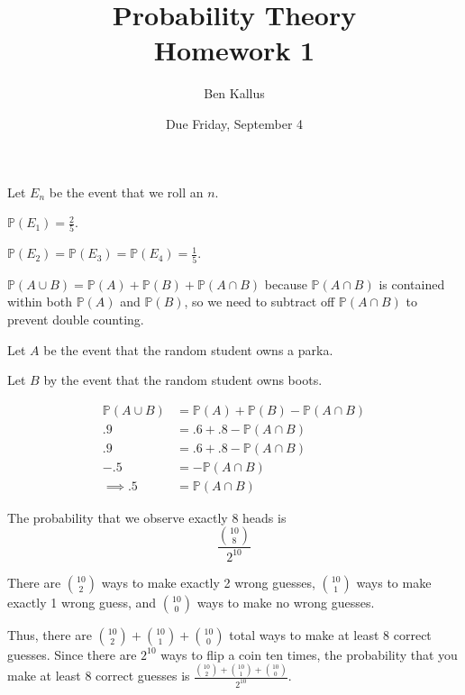 \documentclass[12pt]{article}
\title{Probability Theory \\ Homework 1}
\author{Ben Kallus}
\date{Due Friday, September 4}
\begin{document}
\maketitle


    Let $E_n$ be the event that we roll an $n$.

    $\mathbb P(E_1) = \frac 2 5$.
    
    $\mathbb P(E_2) = \mathbb P(E_3) = \mathbb P(E_4) = \frac 1 5$.

\medskip
{}


    $\mathbb P(A \cup B) = \mathbb P(A) + \mathbb P(B) + \mathbb P(A \cap B)$ because $\mathbb P(A \cap B)$ is contained within both $\mathbb P(A)$ and $\mathbb P(B)$, so we need to subtract off $\mathbb P(A \cap B)$ to prevent double counting.

\medskip
{}

    Let $A$ be the event that the random student owns a parka.
    
    Let $B$ by the event that the random student owns boots.
    
    \begin{align*}
        \mathbb P(A \cup B) &= \mathbb P(A) + \mathbb P(B) - \mathbb P(A \cap B) \\
        .9 &= .6 + .8 - \mathbb P(A \cap B) \\
        .9 &= .6 + .8 - \mathbb P(A \cap B) \\
        -.5 &= - \mathbb P(A \cap B) \\
        \implies .5 &= \mathbb P(A \cap B)
    \end{align*}

\newpage
{}


    The probability that we observe exactly 8 heads is $$\frac{{10 \choose 8}}{2^{10}}$$
    
\medskip
{}

    There are $10 \choose 2$ ways to make exactly 2 wrong guesses, $10 \choose 1$ ways to make exactly 1 wrong guess, and $10 \choose 0$ ways to make no wrong guesses.
    
    Thus, there are ${10 \choose 2} + {10 \choose 1} + {10 \choose 0}$ total ways to make at least 8 correct guesses. Since there are $2^{10}$ ways to flip a coin ten times, the probability that you make at least 8 correct guesses is $\frac {{10 \choose 2} + {10 \choose 1} + {10 \choose 0}} {2^{10}}$.
\end{document}
